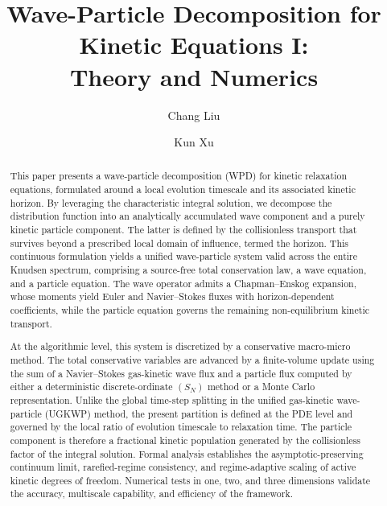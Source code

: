 \documentclass[preprint,12pt]{elsarticle}
\begin{document}
\begin{frontmatter}
\title{Wave-Particle Decomposition for Kinetic Equations I: \\ Theory and Numerics}
\author[iapcm]{Chang Liu}
\author[hkustmath,hkustmae,hkustsri]{Kun Xu}

\address[iapcm]{Institute of Applied Physics and Computational Mathematics, Beijing, P.R. China}
\address[hkustmath]{Department of Mathematics, Hong Kong University of Science and Technology, Clear Water Bay, Kowloon, Hong Kong}
\address[hkustmae]{Department of Mechanical and Aerospace Engineering, Hong Kong University of Science and Technology, Clear Water Bay, Kowloon, Hong Kong}
\address[hkustsri]{Shenzhen Research Institute, Hong Kong University of Science and Technology, Shenzhen, China}

\begin{abstract}

This paper presents a wave-particle decomposition (WPD) for kinetic relaxation equations, formulated around a local evolution timescale and its associated kinetic horizon. By leveraging the characteristic integral solution, we decompose the distribution function into an analytically accumulated wave component and a purely kinetic particle component. The latter is defined by the collisionless transport that survives beyond a prescribed local domain of influence, termed the horizon. This continuous formulation yields a unified wave-particle system valid across the entire Knudsen spectrum, comprising a source-free total conservation law, a wave equation, and a particle equation. The wave operator admits a Chapman--Enskog expansion, whose moments yield Euler and Navier--Stokes fluxes with horizon-dependent coefficients, while the particle equation governs the remaining non-equilibrium kinetic transport.

At the algorithmic level, this system is discretized by a conservative macro-micro method. The total conservative variables are advanced by a finite-volume update using the sum of a Navier--Stokes gas-kinetic wave flux and a particle flux computed by either a deterministic discrete-ordinate $(S_N)$ method or a Monte Carlo representation. Unlike the global time-step splitting in the unified gas-kinetic wave-particle (UGKWP) method, the present partition is defined at the PDE level and governed by the local ratio of evolution timescale to relaxation time. The particle component is therefore a fractional kinetic population generated by the collisionless factor of the integral solution. Formal analysis establishes the asymptotic-preserving continuum limit, rarefied-regime consistency, and regime-adaptive scaling of active kinetic degrees of freedom. Numerical tests in one, two, and three dimensions validate the accuracy, multiscale capability, and efficiency of the framework.



\end{abstract}
\end{frontmatter}
\end{document}
